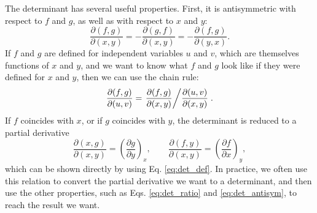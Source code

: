 \documentclass[twocolumn, 10pt]{article}
\numberwithin{equation}{section}
\begin{document}
The determinant has several useful properties.
%
First, it is antisymmetric with respect to $f$ and $g$,
as well as with respect to $x$ and $y$:
\begin{equation}
\frac{ \partial (f, g) } {\partial (x, y) }
=
-\frac{ \partial (g, f) } {\partial (x, y) }
=
-\frac{ \partial (f, g) } {\partial (y, x) }.
  \label{eq:det_antisym}
\end{equation}
%
If $f$ and $g$ are defined for independent variables
$u$ and $v$, which are themselves functions of $x$ and $y$,
and we want to know what $f$ and $g$ look like
if they were defined for $x$ and $y$,
then we can use the chain rule:
\begin{equation}
  \frac{ \partial (f, g) } {\partial (u, v) }
  =
  \left.
    \frac{ \partial (f, g) } {\partial (x, y) }
  \middle/
    \frac{ \partial (u, v) } {\partial (x, y) }
  \right.
  .
  \label{eq:det_ratio}
\end{equation}
%
If $f$ coincides with $x$,
or if $g$ coincides with $y$,
the determinant is reduced to a partial derivative
\begin{equation}
  \frac{ \partial (x, g) } {\partial (x, y) }
  =\left( \frac{ \partial g } {\partial y } \right)_{x}
  ,
  \qquad
  \frac{ \partial (f, y) } {\partial (x, y) }
  =\left( \frac{ \partial f } {\partial x } \right)_{y}
  ,
  \label{eq:det_parder}
\end{equation}
which can be shown directly by using Eq. \eqref{eq:det_def}.
%
In practice, we often use this relation
to convert the partial derivative we want
to a determinant, and then use the other properties,
such as Eqs. \eqref{eq:det_ratio} and \eqref{eq:det_antisym},
to reach the result we want.
\end{document}
